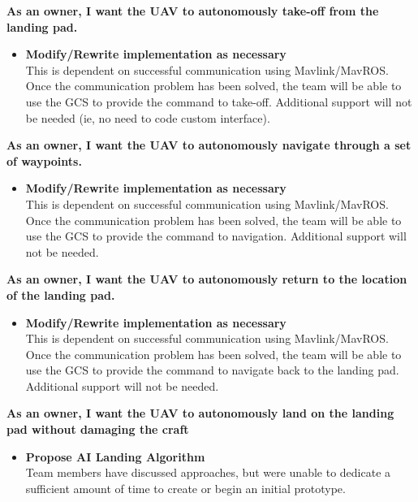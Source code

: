 \vspace{3mm}
\noindent \large{\textbf{As an owner, I want the UAV to autonomously take-off from the landing pad.}}
\normalsize
\begin{itemize}
\item \textbf{Modify/Rewrite implementation as necessary}\\
This is dependent on successful communication using Mavlink/MavROS. Once the communication problem has been solved, the team will be able to use the GCS to provide the command to take-off. Additional support will not be needed (ie, no need to code custom interface).
\end{itemize}

\vspace{3mm}
\noindent \large{\textbf{As an owner, I want the UAV to autonomously navigate through a set of waypoints.}}
\normalsize
\begin{itemize}
\item \textbf{Modify/Rewrite implementation as necessary}\\
This is dependent on successful communication using Mavlink/MavROS. Once the communication problem has been solved, the team will be able to use the GCS to provide the command to navigation. Additional support will not be needed.
\end{itemize}


\vspace{3mm}
\noindent \large{\textbf{As an owner, I want the UAV to autonomously return to the location of the landing pad.}}
\normalsize
\begin{itemize}
\item \textbf{Modify/Rewrite implementation as necessary}\\
This is dependent on successful communication using Mavlink/MavROS. Once the communication problem has been solved, the team will be able to use the GCS to provide the command to navigate back to the landing pad. Additional support will not be needed.
\end{itemize}

\vspace{3mm}
\noindent \large{\textbf{As an owner, I want the UAV to autonomously land on the landing pad without damaging the craft}}
\normalsize
\begin{itemize}
\item \textbf{Propose AI Landing Algorithm}\\
Team members have discussed approaches, but were unable to dedicate a sufficient amount of time to create or begin an initial prototype.
\end{itemize}

